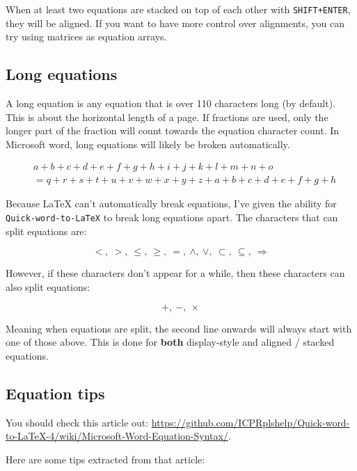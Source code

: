 \documentclass[12pt]{article}
\theoremstyle{plain}
\theoremstyle{remark}
\theoremstyle{definition}
\begin{document}
When at least two equations are stacked on top of each other with
\texttt{SHIFT+ENTER}, they will be aligned. If you want to have more
control over alignments, you can try using matrices as equation arrays.


\subsection{Long equations}

A long equation is any equation that is over 110 characters long (by
default). This is about the horizontal length of a page. If fractions
are used, only the longer part of the fraction will count towards the
equation character count. In Microsoft word, long equations will likely
be broken automatically.

\begin{align*}
& a + b + c + d + e + f + g + h + i + j + k + l + m + n + o   \\
 &= q + r + s + t + u + v + w + x + y + z + a + b + c + d + e + f + g + h
\end{align*}


Because LaTeX can't automatically break equations, I've given the
ability for \texttt{Quick-word-to-LaTeX} to break long equations apart.
The characters that can split equations are:

\[< ,\  > ,\  \leq ,\  \geq ,\  = ,\  \land ,\  \vee ,\  \subset ,\  \subseteq ,\  \Rightarrow\]

However, if these characters don't appear for a while, then these
characters can also split equations:

\[+ ,\  - ,\  \times\]

Meaning when equations are split, the second line onwards will always
start with one of those above. This is done for \textbf{both}
display-style and aligned / stacked equations.


\subsection{Equation tips}

You should check this article out:
\href{https://github.com/ICPRplshelp/Quick-word-to-LaTeX-4/wiki/Microsoft-Word-Equation-Syntax}{https://github.com/ICPRplshelp/Quick-word-to-LaTeX-4/wiki/Microsoft-Word-Equation-Syntax/}.

Here are some tips extracted from that article:
\end{document}
